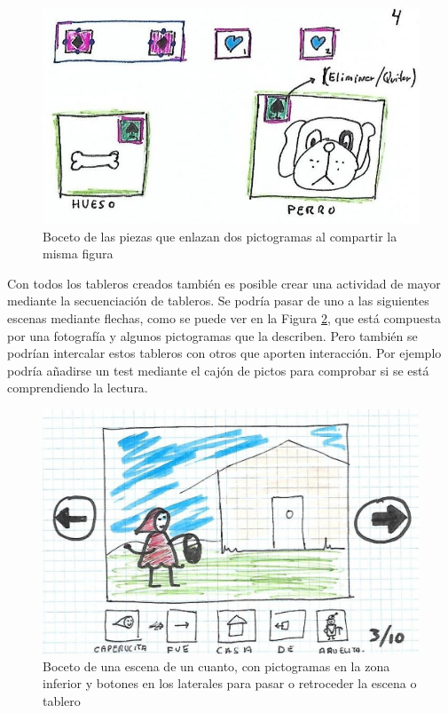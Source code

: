 \begin{itemize}
	\begin{figure}[h!]
		\centering
		\includegraphics[width=0.7\linewidth]{Imagenes/Bitmap/componenteEnla}
		\caption{Boceto de las piezas que enlazan dos pictogramas al compartir la misma figura}
		\label{fig:componenteenla}
	\end{figure}

	
\end{itemize}

Con todos los tableros creados también es posible crear una actividad de mayor mediante la secuenciación de tableros. Se podría pasar de uno a las siguientes escenas mediante flechas, como se puede ver en la Figura \ref{fig:cuento}, que está compuesta por una fotografía y algunos pictogramas que la describen. Pero también se podrían intercalar estos tableros con otros que aporten interacción. Por ejemplo podría añadirse un test mediante el cajón de pictos para comprobar si se está comprendiendo la lectura.

\begin{figure}[h!]
	\centering
	\includegraphics[width=0.7\linewidth]{Imagenes/Bitmap/Cuento}
	\caption{Boceto de una escena de un cuanto, con pictogramas en la zona inferior y botones en los laterales para pasar o retroceder la escena o tablero}
	\label{fig:cuento}
\end{figure}


